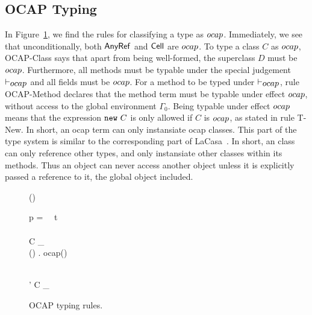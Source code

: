 \subsection{OCAP Typing}%
\label{sub:ocap_typing}

In Figure~\ref{fig:ocap_typing}, we find the rules for classifying a type as $\mbox{$ocap$}$.
Immediately, we see that unconditionally, both $\mbox{$\mathsf{AnyRef}$}$ and $\mbox{$\mathsf{Cell}$}$ are
$\mbox{$ocap$}$. To type a class $C$ as $\mbox{$ocap$}$, {\sc OCAP-Class} says that apart from being
well-formed, the superclass $D$ must be $\mbox{$ocap$}$. Furthermore, all methods must
be typable under the special judgement $\vdash_{\mbox{$ocap$}}$ and all fields must be
$\mbox{$ocap$}$.  For a method to be typed under $\vdash_{\mbox{$ocap$}}$, rule {\sc
OCAP-Method} declares that the method term must be typable under effect $\mbox{$ocap$}$,
without access to the global environment $\Gamma_0$. Being typable under effect
$\mbox{$ocap$}$ means that the expression $\mbox{\mdseries\texttt{new}~$C$}$ is only allowed if $C$ is $\mbox{$ocap$}$, as
stated in rule {\sc T-New}. In short, an ocap term can only instansiate ocap
classes. This part of the type system is similar to the corresponding part of
LaCasa~\parencite{conf/oopsla/HallerL16}. In short, an \ocap{} class can only
reference other \ocap{} types, and only instansiate other \ocap{} classes within
its methods. Thus an \ocap{} object can never access another object unless it is
explicitly passed a reference to it, the global object included.

\begin{figure}
  {\ocap{(\AnyRefType{})}}

  \RuleSpace{}

  {\ocap(\CellType)}

  \RuleSpace{}

  { 
  p = ~~t \\
   \in {} \\
   \andalso C \vdash_{\ocap}  \\
  \forall () \in {}. \: ocap(\sigma)
  }
  {}

  \RuleSpace{}

  { \\
  \tau' \stof \tau}
  {C \vdash_{\ocap} }
  \caption{\RACL{} OCAP typing rules.}
  \label{fig:ocap_typing}
\end{figure}


